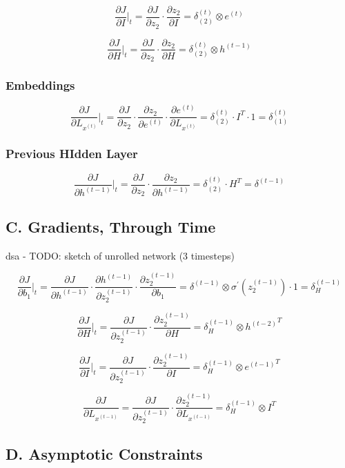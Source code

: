 \documentclass{article}
\begin{document}
$$
	\frac {\partial J}{\partial I}\Big|_t = \frac {\partial J}{\partial z_2} \cdot \frac {\partial z_2}{\partial I} = \delta_{(2)}^{(t)} \otimes {e^{(t)}}
$$

$$
	\frac {\partial J}{\partial H}\Big|_t = \frac {\partial J}{\partial z_2} \cdot \frac {\partial z_2}{\partial H} = \delta_{(2)}^{(t)} \otimes {h^{(t-1)}}
$$

\subsubsection*{Embeddings}
$$
	\frac {\partial J}{\partial L_{x^{(t)}}}\Big|_t = \frac {\partial J}{\partial z_2} \cdot \frac{\partial z_2}{\partial e^{(t)}}\cdot \frac {\partial e^{(t)}}{\partial  L_{x^{(t)}}} = \delta_{(2)}^{(t)} \cdot I^{T} \cdot 1 = \delta_{(1)}^{(t)}
$$

\subsubsection*{Previous HIdden Layer}
$$
	\frac {\partial J}{\partial h^{(t-1)}}\Big|_t = \frac {\partial J}{\partial z_2} \cdot \frac {\partial z_2}{\partial h^{(t-1)}} = \delta_{(2)}^{(t)} \cdot H^{T} = \delta^{(t-1)}
$$

\subsection*{C. Gradients, Through Time}
dsa - TODO: sketch of unrolled network (3 timesteps)

$$
	\frac {\partial J}{\partial b_1}\Big|_t = \frac {\partial J}{\partial h^{(t-1)}} \cdot \frac{\partial h^{(t-1)}}{\partial z_2^{(t-1)}} \cdot \frac{\partial z_2^{(t-1)}}{\partial b_1} = \delta^{(t-1)} \otimes \sigma^{'}\left(z_2^{(t-1)}\right) \cdot 1 = \delta_{H}^{(t-1)}
$$

$$
	\frac {\partial J}{\partial H} \Big|_t= \frac {\partial J}{\partial z_2^{(t-1)}} \cdot \frac{\partial z_2^{(t-1)}}{\partial  H} = \delta_{H}^{(t-1)} \otimes {h^{(t-2)}}^{T}
$$

$$
	\frac {\partial J}{\partial I} \Big|_t= \frac {\partial J}{\partial z_2^{(t-1)}} \cdot \frac{\partial z_2^{(t-1)}}{\partial  I} = \delta_{H}^{(t-1)} \otimes {e^{(t-1)}}^{T}
$$

$$
	\frac {\partial J}{\partial L_{x^{(t-1)}}} = \frac {\partial J}{\partial z_2^{(t-1)}} \cdot \frac{\partial z_2^{(t-1)}}{\partial  L_{x^{(t-1)}}} = \delta_{H}^{(t-1)} \otimes I^{T}
$$


\subsection*{D. Asymptotic Constraints}
\end{document}
